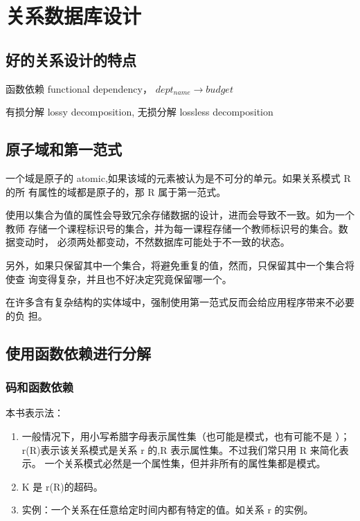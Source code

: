 \documentclass{dingjia}
\begin{document}
\chapter{关系数据库设计}

\section{好的关系设计的特点}

函数依赖 functional dependency， $dept_{name} \rightarrow budget$

有损分解 lossy decomposition, 无损分解 lossless decomposition

\section{原子域和第一范式}

一个域是原子的 atomic,如果该域的元素被认为是不可分的单元。如果关系模式 R 的所
有属性的域都是原子的，那 R 属于第一范式。

使用以集合为值的属性会导致冗余存储数据的设计，进而会导致不一致。如为一个教师
存储一个课程标识号的集合，并为每一课程存储一个教师标识号的集合。数据变动时，
必须两处都变动，不然数据库可能处于不一致的状态。

另外，如果只保留其中一个集合，将避免重复的值，然而，只保留其中一个集合将使查
询变得复杂，并且也不好决定究竟保留哪一个。

在许多含有复杂结构的实体域中，强制使用第一范式反而会给应用程序带来不必要的负
担。

\section{使用函数依赖进行分解}

\subsection{码和函数依赖}

本书表示法：
\begin{enumerate}
\item 一般情况下，用小写希腊字母表示属性集（也可能是模式，也有可能不是
  ）；r(R)表示该关系模式是关系 r 的,R 表示属性集。不过我们常只用 R 来简化表示。
  一个关系模式必然是一个属性集，但并非所有的属性集都是模式。
\item K 是 r(R)的超码。

\item  实例：一个关系在任意给定时间内都有特定的值。如关系 r 的实例。
\end{enumerate}
\end{document}
